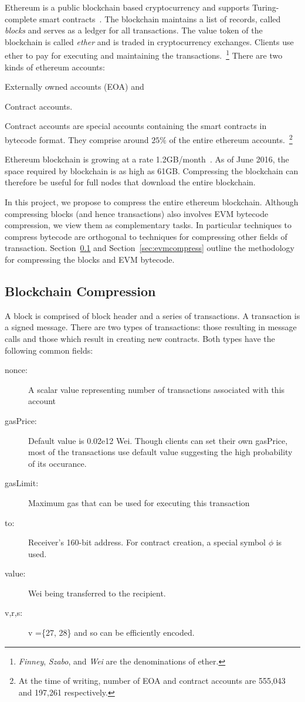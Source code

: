 
Ethereum is a public blockchain based cryptocurrency and supports Turing-complete smart contracts~\cite{ethereum}.
The blockchain maintains a list of records, called \emph{blocks} and serves as a ledger for all transactions.
The value token of the blockchain is called \emph{ether} and 
is traded in cryptocurrency exchanges.
Clients use ether to pay for executing and maintaining the transactions.~\footnote{
\emph{Finney}, \emph{Szabo}, and \emph{Wei} are the denominations of ether.}
There are two kinds of ethereum accounts: 
\begin{enumerate*}
	\item Externally owned accounts (EOA) and
	\item Contract accounts.
\end{enumerate*}
Contract accounts are special accounts containing the smart contracts in bytecode format. They comprise around $25\%$ of the entire ethereum accounts.~\footnote{
At the time of writing, number of EOA and contract accounts are 555,043 and 197,261 respectively.}  
 
Ethereum blockchain is growing at a rate 1.2GB/month~\cite{ethdiskspace}.
As of June 2016, the space required by blockchain is as high as 61GB.
Compressing the blockchain can therefore be useful for full nodes that download the entire blockchain.

In this project, we propose to compress the entire ethereum blockchain. 
Although compressing blocks (and hence transactions) also involves EVM bytecode compression, 
we view them as complementary tasks. 
In particular techniques to compress bytecode are orthogonal to techniques for compressing other fields of transaction.
Section~\ref{sec:blockcompress} and 
Section~\ref{sec:evmcompress}  
outline the methodology for compressing the blocks and EVM bytecode.

\subsection{Blockchain Compression}\label{sec:blockcompress}

A block is comprised of block header and a series of transactions. A transaction is a signed message.
There are two types of transactions: those resulting in message calls and those which result in creating new contracts.
Both types have the following common fields:
\begin{description}
  \item[nonce:] A scalar value representing number of transactions associated with this account
  \item[gasPrice:] Default value is 0.02e12 Wei. Though clients can set their own gasPrice, most of the transactions use default value suggesting the high probability of its occurance.
  \item[gasLimit:] Maximum gas that can be used for executing this transaction
  \item[to:] Receiver's 160-bit address. For contract creation, a special symbol $\phi$ is used.
  \item[value:] Wei being transferred to the recipient.
  \item[v,r,s:] v =\{27, 28\} and so can be efficiently encoded.
\end{description}

